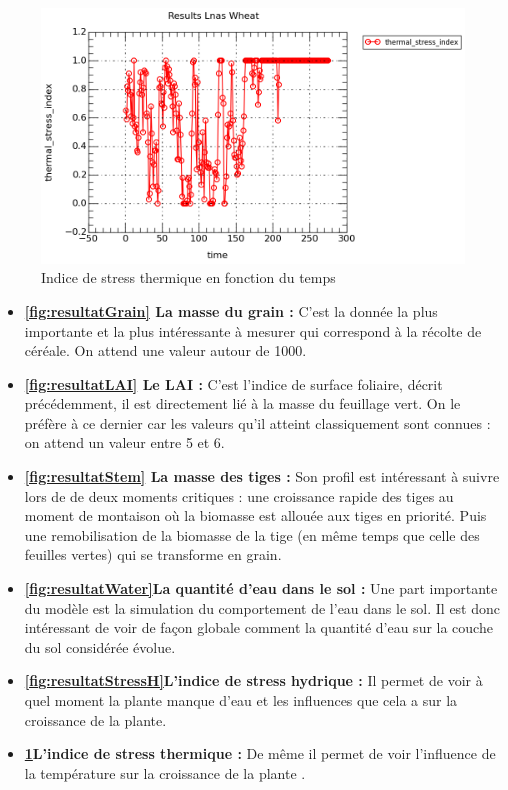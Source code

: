 \begin{figure}

\begin{center}
 \includegraphics[scale = 0.7]{./img/thermicStress}
 \caption{Indice de stress thermique en fonction du temps}
 \label{fig:resultatStressT}
\end{center}

\end{figure}

\begin{itemize}

	\item \textbf {\ref{fig:resultatGrain} La masse du grain :} C'est la donnée la plus importante et la plus intéressante à mesurer qui correspond à la récolte de céréale. On attend une valeur autour de 1000.
	
	\item \textbf{\ref{fig:resultatLAI} Le LAI :} C'est l'indice de surface foliaire, décrit précédemment, il est directement lié à la masse du feuillage vert. On le préfère à ce dernier car les valeurs qu'il atteint classiquement sont connues : on attend un valeur entre 5 et 6.
	
	\item \textbf{\ref{fig:resultatStem} La masse des tiges :} Son profil est intéressant à suivre lors de de deux moments critiques : une croissance rapide des tiges au moment de montaison où la biomasse est allouée aux tiges en priorité. Puis une remobilisation de la biomasse de la tige (en même temps que celle des feuilles vertes) qui se transforme en grain.
	
	\item \textbf{\ref{fig:resultatWater}La quantité d'eau dans le sol :} Une part importante du modèle est la simulation du comportement de l'eau dans le sol. Il est donc intéressant de voir de façon globale comment la quantité d'eau sur la couche du sol considérée évolue.
	
	\item \textbf{\ref{fig:resultatStressH}L'indice de stress hydrique :} Il permet de voir à quel moment la plante manque d'eau et les influences que cela a sur la croissance de la plante.
	
	\item \textbf{\ref{fig:resultatStressT}L'indice de stress thermique :} De même il permet de voir l'influence de la température sur la croissance de la plante .

\end{itemize}

